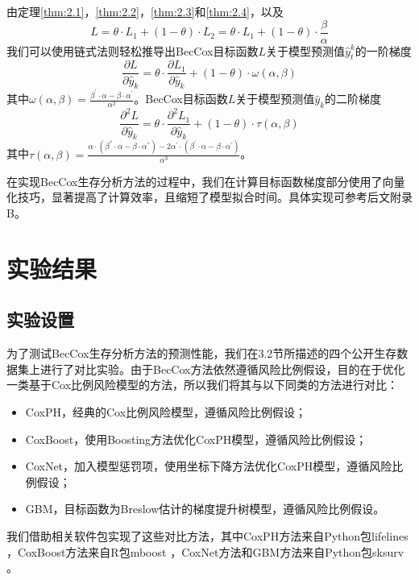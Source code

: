 由定理\ref{thm:2.1}，\ref{thm:2.2}，\ref{thm:2.3}和\ref{thm:2.4}，以及
\begin{equation}
L=\theta\cdot L_1 + (1-\theta)\cdot L_2= \theta\cdot L_1 + (1-\theta)\cdot \frac{\beta}{\alpha}
\end{equation}
我们可以使用链式法则轻松推导出BecCox目标函数$L$关于模型预测值$\hat{y}_t^k$的一阶梯度
\begin{equation}
\frac{\partial L}{\partial \hat{y}_k}=\theta\cdot \frac{\partial L_1}{\partial \hat{y}_k} + (1-\theta)\cdot \omega(\alpha, \beta)
\end{equation}
其中$\omega(\alpha, \beta)=\frac{\beta^{'}\cdot \alpha - \beta\cdot \alpha^{'}}{\alpha^2}$。BecCox目标函数$L$关于模型预测值$\hat{y}_k$的二阶梯度
\begin{equation}
\frac{\partial^2 L}{\partial \hat{y}_k}=\theta\cdot \frac{\partial^2 L_1}{\partial \hat{y}_k} + (1-\theta)\cdot \tau(\alpha, \beta)
\end{equation} 
其中$\tau(\alpha, \beta)=\frac{\alpha\cdot (\beta^{''}\cdot \alpha - \beta\cdot \alpha^{''})-2\alpha^{'}\cdot (\beta^{'}\cdot \alpha - \beta\cdot \alpha^{'})}{\alpha^3}$。

在实现BecCox生存分析方法的过程中，我们在计算目标函数梯度部分使用了向量化技巧，显著提高了计算效率，且缩短了模型拟合时间。具体实现可参考后文附录B。

\section{实验结果}

\subsection{实验设置}

为了测试BecCox生存分析方法的预测性能，我们在3.2节所描述的四个公开生存数据集上进行了对比实验。由于BecCox方法依然遵循风险比例假设，目的在于优化一类基于Cox比例风险模型的方法，所以我们将其与以下同类的方法进行对比：
\begin{itemize}
  \item CoxPH，经典的Cox比例风险模型，遵循风险比例假设；
  \item CoxBoost，使用Boosting方法优化CoxPH模型，遵循风险比例假设；
  \item CoxNet，加入模型惩罚项，使用坐标下降方法优化CoxPH模型，遵循风险比例假设；
  \item GBM，目标函数为Breslow估计的梯度提升树模型，遵循风险比例假设。
\end{itemize}
我们借助相关软件包实现了这些对比方法，其中CoxPH方法来自Python包lifelines ，CoxBoost方法来自R包mboost ，CoxNet方法和GBM方法来自Python包sksurv 。

